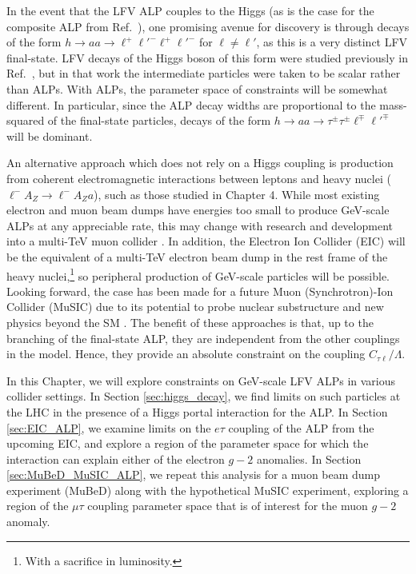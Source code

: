 In the event that the LFV ALP couples to the Higgs (as is the case for the composite ALP from Ref.~\cite{Davoudiasl:2017zws}), one promising avenue for discovery is through decays of the form $h \rightarrow a a \rightarrow \ell^+\ell'^-\ell^+\ell'^-$ for $\ell \neq \ell'$, as this is a very distinct LFV final-state. LFV decays of the Higgs boson of this form were studied previously in Ref.~\cite{Evans:2019xer}, but in that work the intermediate particles were taken to be scalar rather than ALPs. With ALPs, the parameter space of constraints will be somewhat different. In particular, since the ALP decay widths are proportional to the mass-squared of the final-state particles, decays of the form $h \rightarrow aa \rightarrow \tau^\pm\tau^\pm \ell^\mp \ell'^\mp$ will be dominant.

An alternative approach which does not rely on a Higgs coupling is production from coherent electromagnetic interactions between leptons and heavy nuclei ($\ell^- A_Z \rightarrow \ell^- A_Z a$), such as those studied in Chapter 4. While most existing electron and muon beam dumps have energies too small to produce GeV-scale ALPs at any appreciable rate, this may change with research and development into a multi-TeV muon collider \cite{Delahaye:2013jla,Long:2020wfp,Accettura:2023ked}. In addition, the Electron Ion Collider (EIC) will be the equivalent of a multi-TeV electron beam dump in the rest frame of the heavy nuclei,\footnote{With a sacrifice in luminosity.} so peripheral production of GeV-scale particles will be possible. Looking forward, the case has been made for a future Muon (Synchrotron)-Ion Collider (MuSIC) due to its potential to probe nuclear substructure \cite{Acosta:2021qpx,Acosta:2022ejc} and new physics beyond the SM \cite{Davoudiasl:2024vje}. The benefit of these approaches is that, up to the branching of the final-state ALP, they are independent from the other couplings in the model. Hence, they provide an absolute constraint on the coupling $C_{\tau \ell}/\Lambda$. 

In this Chapter, we will explore constraints on GeV-scale LFV ALPs in various collider settings. In Section \ref{sec:higgs_decay}, we find limits on such particles at the LHC in the presence of a Higgs portal interaction for the ALP. In  Section \ref{sec:EIC_ALP}, we examine limits on the $e\tau$ coupling of the ALP from the upcoming EIC, and explore a region of the parameter space for which the interaction can explain either of the electron $g-2$ anomalies. In Section \ref{sec:MuBeD_MuSIC_ALP}, we repeat this analysis for a muon beam dump experiment (MuBeD) along with the hypothetical MuSIC experiment, exploring a region of the $\mu\tau$ coupling parameter space that is of interest for the muon $g-2$ anomaly.

